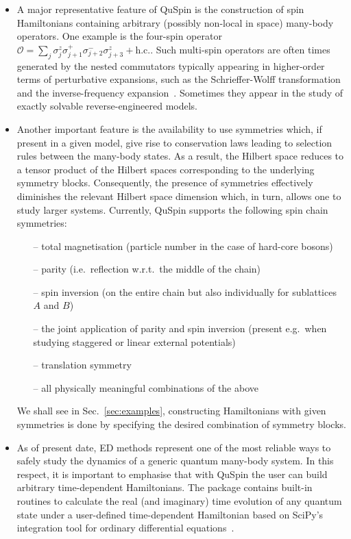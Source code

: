 \documentclass{SciPost}
\newcommand\0{\scalebox{-1}[1]{0}}
\begin{document}
\begin{itemize}
	\item A major representative feature of QuSpin is the construction of spin Hamiltonians containing arbitrary (possibly non-local in space) many-body operators. One example is the four-spin operator $\mathcal{O}= \sum_j \sigma^z_{j}\sigma^+_{j+1}\sigma^-_{j+2}\sigma^z_{j+3} + \mathrm{h.c.}$. Such multi-spin operators are often times generated by the nested commutators typically appearing in higher-order terms of perturbative expansions, such as the Schrieffer-Wolff transformation~\cite{schrieffer_66,bravyi_11,bukov_SW} and the inverse-frequency expansion~\cite{goldman_14,bukov_14}. Sometimes they appear in the study of exactly solvable reverse-engineered models.
	\item Another important feature is the availability to use symmetries which, if present in a given model, give rise to conservation laws leading to selection rules between the many-body states. As a result, the Hilbert space reduces to a tensor product of the Hilbert spaces corresponding to the underlying symmetry blocks. Consequently, the presence of symmetries effectively diminishes the relevant Hilbert space dimension which, in turn, allows one to study larger systems. Currently, QuSpin supports the following spin chain symmetries:
	\begin{itemize}
		\item[--] total magnetisation (particle number in the case of hard-core bosons)
		\item[--] parity (i.e.~reflection w.r.t.~the middle of the chain)
		\item[--] spin inversion (on the entire chain but also individually for sublattices $A$ and $B$)
		\item[--] the joint application of parity and spin inversion (present e.g.~when studying staggered or linear external potentials)
		\item[--] translation symmetry
		\item[--] all physically meaningful combinations of the above
	\end{itemize}
	We shall see in Sec.~\ref{sec:examples}, constructing Hamiltonians with given symmetries is done by specifying the desired combination of symmetry blocks.
	\item As of present date, ED methods represent one of the most reliable ways to safely study the dynamics of a generic quantum many-body system. In this respect, it is important to emphasise that with QuSpin the user can build arbitrary time-dependent Hamiltonians. The package contains built-in routines to calculate the real (and imaginary) time evolution of any quantum state under a user-defined time-dependent Hamiltonian based on SciPy's integration tool for ordinary differential equations~\cite{SciPy_package}.

\end{itemize}
\end{document}
